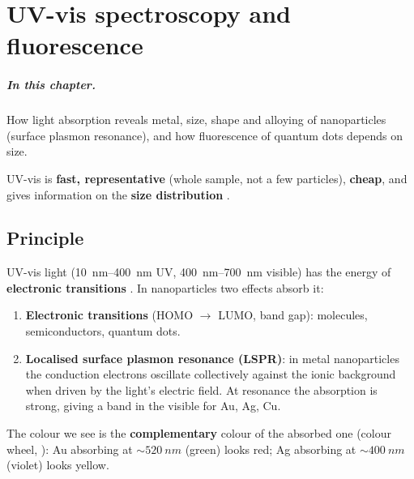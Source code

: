 \chapter{UV-vis spectroscopy and fluorescence}
\label{ch:uvvis}

\paragraph{In this chapter.} How light absorption reveals metal, size, shape and alloying of nanoparticles (surface
plasmon resonance), and how fluorescence of quantum dots depends on size.

\begin{classbox}
UV-vis is \textbf{fast, representative} (whole sample, not a few particles), \textbf{cheap}, and gives information on
the \textbf{size distribution} .
\end{classbox}

\section{Principle}
UV-vis light (\SIrange{10}{400}{nm} UV, \SIrange{400}{700}{nm} visible) has the energy of \textbf{electronic transitions}
. In nanoparticles two effects absorb it:
\begin{enumerate}
  \item \textbf{Electronic transitions} (HOMO $\to$ LUMO, band gap): molecules, semiconductors, quantum dots.
  \item \textbf{Localised surface plasmon resonance (LSPR)}: in metal nanoparticles the conduction electrons oscillate
        collectively against the ionic background when driven by the light's electric field. At resonance
        the absorption is strong, giving a band in the visible for Au, Ag, Cu.
\end{enumerate}
The colour we see is the \textbf{complementary} colour of the absorbed one (colour wheel, ):
Au absorbing at $\sim\SI{520}{nm}$ (green) looks red; Ag absorbing at $\sim\SI{400}{nm}$ (violet) looks yellow.

